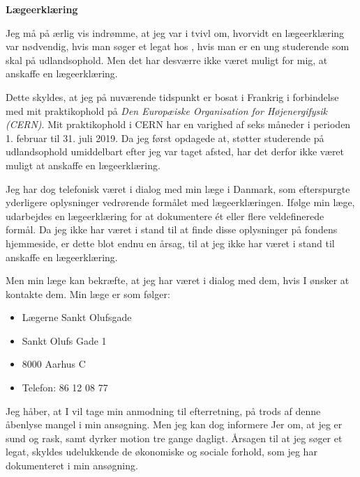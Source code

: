 \documentclass[../Ansoegning.tex]{subfiles}
\begin{document}
\begin{center}
    \Large{\textbf{Lægeerklæring}}
\end{center}

Jeg må på ærlig vis indrømme, at jeg var i tvivl om, hvorvidt en lægeerklæring var nødvendig, hvis man søger et legat hos \FondNavn, hvis man er en ung studerende som skal på udlandsophold. Men det har desværre ikke været muligt for mig, at anskaffe en lægeerklæring. 

Dette skyldes, at jeg på nuværende tidspunkt er bosat i Frankrig i forbindelse med mit praktikophold på \textit{Den Europæiske Organisation for Højenergifysik (CERN)}. Mit praktikophold i CERN har en varighed af seks måneder i perioden 1. februar til 31. juli 2019. Da jeg først opdagede at, {\FondNavn} støtter studerende på udlandsophold umiddelbart efter jeg var taget afsted, har det derfor ikke været muligt at anskaffe en lægeerklæring. 

Jeg har dog telefonisk været i dialog med min læge i Danmark, som efterspurgte yderligere oplysninger vedrørende formålet med lægeerklæringen. Ifølge min læge, udarbejdes en lægeerklæring for at dokumentere ét eller flere veldefinerede formål. Da jeg ikke har været i stand til at finde disse oplysninger på fondens hjemmeside, er dette blot endnu en årsag, til at jeg ikke har været i stand til anskaffe en lægeerklæring.

Men min læge kan bekræfte, at jeg har været i dialog med dem, hvis I ønsker at kontakte dem. Min læge er som følger:
\begin{itemize}
    \item[] Lægerne Sankt Olufsgade
    \item[] Sankt Olufs Gade 1     
    \item[] 8000 Aarhus C           
    \item[] Telefon: 86 12 08 77
\end{itemize}

Jeg håber, at I vil tage min anmodning til efterretning, på trods af denne åbenlyse mangel i min ansøgning. Men jeg kan dog informere Jer om, at jeg er sund og rask, samt dyrker motion tre gange dagligt. Årsagen til at jeg søger et legat, skyldes udelukkende de økonomiske og sociale forhold, som jeg har dokumenteret i min ansøgning.
\end{document}
